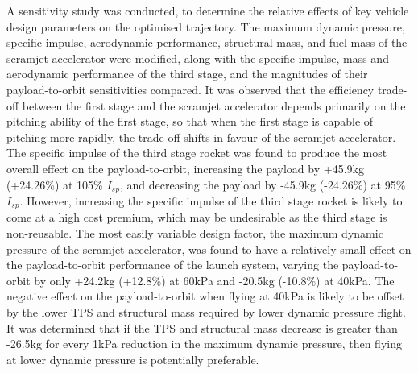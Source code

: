 A sensitivity study was conducted, to determine the relative effects of key vehicle design parameters on the optimised trajectory. 
The maximum dynamic pressure, specific impulse, aerodynamic performance, structural mass, and fuel mass of the scramjet accelerator were modified, along with the specific impulse, mass and aerodynamic performance of the third stage, and the magnitudes of their payload-to-orbit sensitivities compared. 
It was observed that the efficiency trade-off between the first stage and the scramjet accelerator depends primarily on the pitching ability of the first stage, so that when the first stage is capable of pitching more rapidly, the trade-off shifts in favour of the scramjet accelerator. 
The specific impulse of the third stage rocket was found to produce the most overall effect on the payload-to-orbit, increasing the payload by +45.9kg (+24.26\%) at 105\% $I_{sp}$, and decreasing the payload by -45.9kg (-24.26\%) at 95\% $I_{sp}$. However, increasing the specific impulse of the third stage rocket is likely to come at a high cost premium, which may be undesirable as the third stage is non-reusable. 
The most easily variable design factor, the maximum dynamic pressure of the scramjet accelerator, was found to have a relatively small effect on the payload-to-orbit performance of the launch system, varying the payload-to-orbit by only +24.2kg (+12.8\%) at 60kPa and -20.5kg (-10.8\%) at 40kPa. The negative effect on the payload-to-orbit when flying at 40kPa is likely to be offset by the lower TPS and structural mass required by lower dynamic pressure flight. It was determined that if the TPS and structural mass decrease is greater than -26.5kg for every 1kPa reduction in the maximum dynamic pressure, then flying at lower dynamic pressure is potentially preferable. 







